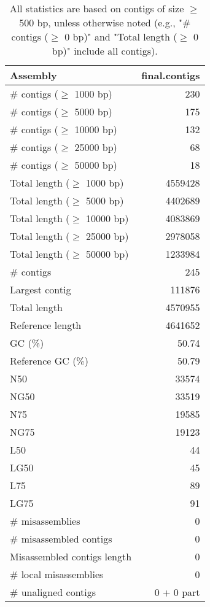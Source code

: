 \documentclass[12pt,a4paper]{article}
\begin{document}
\begin{table}[ht]
\begin{center}
\caption{All statistics are based on contigs of size $\geq$ 500 bp, unless otherwise noted (e.g., "\# contigs ($\geq$ 0 bp)" and "Total length ($\geq$ 0 bp)" include all contigs).}
\begin{tabular}{|l*{1}{|r}|}
\hline
Assembly & final.contigs \\ \hline
\# contigs ($\geq$ 1000 bp) & 230 \\ \hline
\# contigs ($\geq$ 5000 bp) & 175 \\ \hline
\# contigs ($\geq$ 10000 bp) & 132 \\ \hline
\# contigs ($\geq$ 25000 bp) & 68 \\ \hline
\# contigs ($\geq$ 50000 bp) & 18 \\ \hline
Total length ($\geq$ 1000 bp) & 4559428 \\ \hline
Total length ($\geq$ 5000 bp) & 4402689 \\ \hline
Total length ($\geq$ 10000 bp) & 4083869 \\ \hline
Total length ($\geq$ 25000 bp) & 2978058 \\ \hline
Total length ($\geq$ 50000 bp) & 1233984 \\ \hline
\# contigs & 245 \\ \hline
Largest contig & 111876 \\ \hline
Total length & 4570955 \\ \hline
Reference length & 4641652 \\ \hline
GC (\%) & 50.74 \\ \hline
Reference GC (\%) & 50.79 \\ \hline
N50 & 33574 \\ \hline
NG50 & 33519 \\ \hline
N75 & 19585 \\ \hline
NG75 & 19123 \\ \hline
L50 & 44 \\ \hline
LG50 & 45 \\ \hline
L75 & 89 \\ \hline
LG75 & 91 \\ \hline
\# misassemblies & 0 \\ \hline
\# misassembled contigs & 0 \\ \hline
Misassembled contigs length & 0 \\ \hline
\# local misassemblies & 0 \\ \hline
\# unaligned contigs & 0 + 0 part \\ \hline

\end{tabular}
\end{center}
\end{table}
\end{document}
